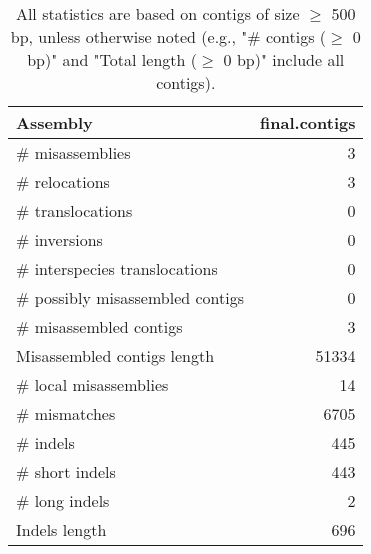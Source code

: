 \documentclass[12pt,a4paper]{article}
\begin{document}
\begin{table}[ht]
\begin{center}
\caption{All statistics are based on contigs of size $\geq$ 500 bp, unless otherwise noted (e.g., "\# contigs ($\geq$ 0 bp)" and "Total length ($\geq$ 0 bp)" include all contigs).}
\begin{tabular}{|l*{1}{|r}|}
\hline
Assembly & final.contigs \\ \hline
\# misassemblies & 3 \\ \hline
\hspace{5mm}\# relocations & 3 \\ \hline
\hspace{5mm}\# translocations & 0 \\ \hline
\hspace{5mm}\# inversions & 0 \\ \hline
\hspace{5mm}\# interspecies translocations & 0 \\ \hline
\# possibly misassembled contigs & 0 \\ \hline
\# misassembled contigs & 3 \\ \hline
Misassembled contigs length & 51334 \\ \hline
\# local misassemblies & 14 \\ \hline
\# mismatches & 6705 \\ \hline
\# indels & 445 \\ \hline
\hspace{5mm}\# short indels & 443 \\ \hline
\hspace{5mm}\# long indels & 2 \\ \hline
Indels length & 696 \\ \hline
\end{tabular}
\end{center}
\end{table}
\end{document}

